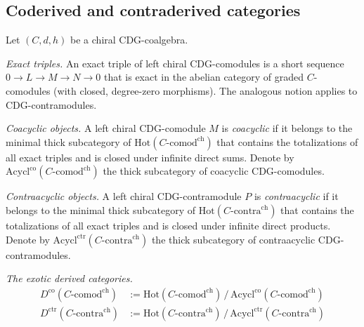 \subsection{Coderived and contraderived categories}
\label{subsec:chiral-coderived-contraderived}

\begin{definition}
\label{def:chiral-coderived}
Let $(C, d, h)$ be a chiral CDG-coalgebra.

\emph{Exact triples.}
An exact triple of left chiral CDG-comodules is a short sequence
$0 \to L \to M \to N \to 0$ that is exact in the abelian category
of graded $C$-comodules (with closed, degree-zero morphisms).
The analogous notion applies to CDG-contramodules.

\emph{Coacyclic objects.}
A left chiral CDG-comodule $M$ is \emph{coacyclic} if it belongs to
the minimal thick subcategory of $\mathrm{Hot}(C\text{-}\mathrm{comod}^{\mathrm{ch}})$
that contains the totalizations of all exact triples and is closed
under infinite direct sums.  Denote by
$\mathrm{Acycl}^{\mathrm{co}}(C\text{-}\mathrm{comod}^{\mathrm{ch}})$
the thick subcategory of coacyclic CDG-comodules.

\emph{Contraacyclic objects.}
A left chiral CDG-contramodule $P$ is \emph{contraacyclic} if it
belongs to the minimal thick subcategory of
$\mathrm{Hot}(C\text{-}\mathrm{contra}^{\mathrm{ch}})$
that contains the totalizations of all exact triples and is closed
under infinite direct products.  Denote by
$\mathrm{Acycl}^{\mathrm{ctr}}(C\text{-}\mathrm{contra}^{\mathrm{ch}})$
the thick subcategory of contraacyclic CDG-contramodules.

\emph{The exotic derived categories.}
\begin{align}
D^{\mathrm{co}}(C\text{-}\mathrm{comod}^{\mathrm{ch}})
&:= \mathrm{Hot}(C\text{-}\mathrm{comod}^{\mathrm{ch}})
\,/\, \mathrm{Acycl}^{\mathrm{co}}(C\text{-}\mathrm{comod}^{\mathrm{ch}})
\label{eq:chiral-coderived}\\
D^{\mathrm{ctr}}(C\text{-}\mathrm{contra}^{\mathrm{ch}})
&:= \mathrm{Hot}(C\text{-}\mathrm{contra}^{\mathrm{ch}})
\,/\, \mathrm{Acycl}^{\mathrm{ctr}}(C\text{-}\mathrm{contra}^{\mathrm{ch}})
\label{eq:chiral-contraderived}
\end{align}
\end{definition}

